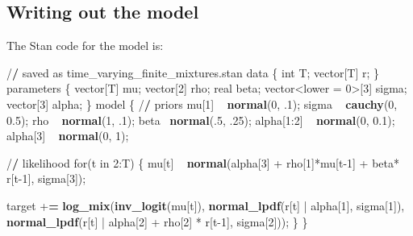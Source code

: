 \documentclass[]{book}
\newenvironment{Shaded}{\begin{snugshade}}{\end{snugshade}}
\newcommand{\KeywordTok}[1]{\textcolor[rgb]{0.13,0.29,0.53}{\textbf{{#1}}}}
\newcommand{\DecValTok}[1]{\textcolor[rgb]{0.00,0.00,0.81}{{#1}}}
\newcommand{\FloatTok}[1]{\textcolor[rgb]{0.00,0.00,0.81}{{#1}}}
\newcommand{\StringTok}[1]{\textcolor[rgb]{0.31,0.60,0.02}{{#1}}}
\newcommand{\ErrorTok}[1]{\textcolor[rgb]{0.64,0.00,0.00}{\textbf{{#1}}}}
\newcommand{\NormalTok}[1]{{#1}}
\begin{document}
\subsection{Writing out the model}\label{writing-out-the-model}

The Stan code for the model is:

\begin{Shaded}
\begin{Highlighting}[]
\NormalTok{/}\ErrorTok{/}\StringTok{ }\NormalTok{saved as time_varying_finite_mixtures.stan}
\NormalTok{data \{}
  \NormalTok{int T;}
  \NormalTok{vector[T] r;}
\NormalTok{\}}
\NormalTok{parameters \{}
  \NormalTok{vector[T] mu;}
  \NormalTok{vector[}\DecValTok{2}\NormalTok{] rho;}
  \NormalTok{real beta;}
  \NormalTok{vector<lower =}\StringTok{ }\DecValTok{0}\NormalTok{>[}\DecValTok{3}\NormalTok{] sigma;}
  \NormalTok{vector[}\DecValTok{3}\NormalTok{] alpha; }
\NormalTok{\}}
\NormalTok{model \{}
  \NormalTok{/}\ErrorTok{/}\StringTok{ }\NormalTok{priors }
  \NormalTok{mu[}\DecValTok{1}\NormalTok{] ~}\StringTok{ }\KeywordTok{normal}\NormalTok{(}\DecValTok{0}\NormalTok{, .}\DecValTok{1}\NormalTok{);}
  \NormalTok{sigma ~}\StringTok{ }\KeywordTok{cauchy}\NormalTok{(}\DecValTok{0}\NormalTok{, }\FloatTok{0.5}\NormalTok{);}
  \NormalTok{rho ~}\StringTok{ }\KeywordTok{normal}\NormalTok{(}\DecValTok{1}\NormalTok{, .}\DecValTok{1}\NormalTok{);}
  \NormalTok{beta~}\StringTok{ }\KeywordTok{normal}\NormalTok{(.}\DecValTok{5}\NormalTok{, .}\DecValTok{25}\NormalTok{);}
  \NormalTok{alpha[}\DecValTok{1}\NormalTok{:}\DecValTok{2}\NormalTok{] ~}\StringTok{ }\KeywordTok{normal}\NormalTok{(}\DecValTok{0}\NormalTok{, }\FloatTok{0.1}\NormalTok{);}
  \NormalTok{alpha[}\DecValTok{3}\NormalTok{] ~}\StringTok{ }\KeywordTok{normal}\NormalTok{(}\DecValTok{0}\NormalTok{, }\DecValTok{1}\NormalTok{);}

  \NormalTok{/}\ErrorTok{/}\StringTok{ }\NormalTok{likelihood}
  \NormalTok{for(t in }\DecValTok{2}\NormalTok{:T) \{}
    \NormalTok{mu[t] ~}\StringTok{ }\KeywordTok{normal}\NormalTok{(alpha[}\DecValTok{3}\NormalTok{] +}\StringTok{ }\NormalTok{rho[}\DecValTok{1}\NormalTok{]*mu[t}\DecValTok{-1}\NormalTok{] +}\StringTok{ }\NormalTok{beta*}\StringTok{ }\NormalTok{r[t}\DecValTok{-1}\NormalTok{], sigma[}\DecValTok{3}\NormalTok{]);}

    \NormalTok{target +}\ErrorTok{=}\StringTok{ }\KeywordTok{log_mix}\NormalTok{(}\KeywordTok{inv_logit}\NormalTok{(mu[t]), }
                      \KeywordTok{normal_lpdf}\NormalTok{(r[t] |}\StringTok{ }\NormalTok{alpha[}\DecValTok{1}\NormalTok{], sigma[}\DecValTok{1}\NormalTok{]), }
                      \KeywordTok{normal_lpdf}\NormalTok{(r[t] |}\StringTok{ }\NormalTok{alpha[}\DecValTok{2}\NormalTok{] +}\StringTok{ }\NormalTok{rho[}\DecValTok{2}\NormalTok{] *}\StringTok{ }\NormalTok{r[t}\DecValTok{-1}\NormalTok{], sigma[}\DecValTok{2}\NormalTok{]));}
  \NormalTok{\}}
\NormalTok{\}}
\end{Highlighting}
\end{Shaded}
\end{document}

